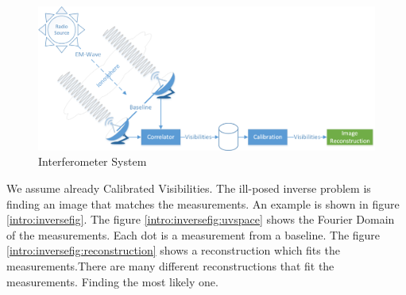\begin{figure}[h]
	\centering
	\includegraphics[width=0.80\linewidth]{./chapters/01.intro/system.png}
	\caption{Interferometer System}
	\label{intro:system}
\end{figure}

We assume already Calibrated Visibilities. The ill-posed inverse problem is finding an image that matches the measurements. An example is shown in figure \ref{intro:inversefig}. The figure \ref{intro:inversefig:uvspace} shows the Fourier Domain of the measurements. Each dot is a measurement from a baseline.
The figure \ref{intro:inversefig:reconstruction} shows a reconstruction which fits the measurements.There are many different reconstructions that fit the measurements. 
Finding the most likely one.

